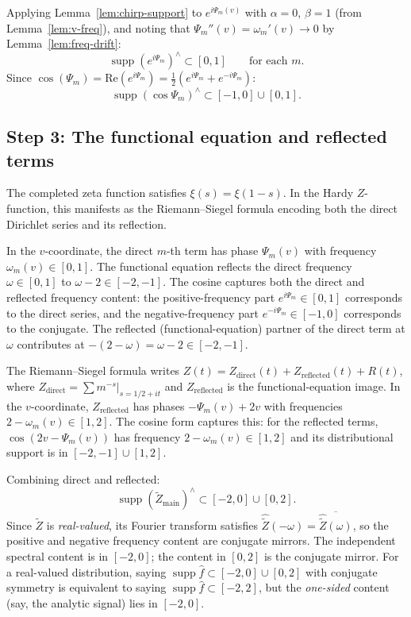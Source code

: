 \documentclass{article}
\newcommand{\tmem}[1]{{\em #1\/}}
\newcommand{\tmop}[1]{\ensuremath{\operatorname{#1}}}
\newcommand{\supp}{\tmop{supp}}
\begin{document}
Applying Lemma~\ref{lem:chirp-support} to $e^{i \Psi_m (v)}$ with $\alpha =
0$, $\beta = 1$ (from Lemma~\ref{lem:v-freq}), and noting that $\Psi_m'' (v) =
\omega_m' (v) \to 0$ by Lemma~\ref{lem:freq-drift}:
\begin{equation}
  \label{eq:direct-support} \supp (e^{i \Psi_m})^{\wedge} \subset [0, 1] 
  \qquad \text{for each } m.
\end{equation}
Since $\cos (\Psi_m) = \mathrm{Re} (e^{i \Psi_m}) = \tfrac{1}{2} (e^{i \Psi_m}
+ e^{- i \Psi_m})$:
\begin{equation}
  \label{eq:cos-support} \supp (\cos \Psi_m)^{\wedge} \subset [- 1, 0] \cup
  [0, 1] .
\end{equation}

\subsection*{Step 3: The functional equation and reflected terms}

The completed zeta function satisfies $\xi (s) = \xi (1 - s)$. In the Hardy
$Z$-function, this manifests as the Riemann--Siegel formula encoding both the
direct Dirichlet series and its reflection.

In the $v$-coordinate, the direct $m$-th term has phase $\Psi_m (v)$ with
frequency $\omega_m (v) \in [0, 1]$. The functional equation reflects the
direct frequency $\omega \in [0, 1]$ to $\omega - 2 \in [- 2, - 1]$. The
cosine captures both the direct and reflected frequency content: the
positive-frequency part $e^{i \Psi_m} \in [0, 1]$ corresponds to the direct
series, and the negative-frequency part $e^{- i \Psi_m} \in [- 1, 0]$
corresponds to the conjugate. The reflected (functional-equation) partner of
the direct term at $\omega$ contributes at $- (2 - \omega) = \omega - 2 \in [-
2, - 1]$.

The Riemann--Siegel formula writes $Z (t) = Z_{\mathrm{direct}} (t) +
Z_{\mathrm{reflected}} (t) + R (t)$, where $Z_{\mathrm{direct}} = \sum m^{- s}
|_{s = 1 / 2 + it}$ and $Z_{\mathrm{reflected}}$ is the functional-equation
image. In the $v$-coordinate, $Z_{\mathrm{reflected}}$ has phases $- \Psi_m
(v) + 2 v$ with frequencies $2 - \omega_m (v) \in [1, 2]$. The cosine form
captures this: for the reflected terms, $\cos (2 v - \Psi_m (v))$ has
frequency $2 - \omega_m (v) \in [1, 2]$ and its distributional support is in
$[- 2, - 1] \cup [1, 2]$.

Combining direct and reflected:
\begin{equation}
  \label{eq:combined-support} \supp (\tilde{Z}_{\mathrm{main}})^{\wedge}
  \subset [- 2, 0] \cup [0, 2] .
\end{equation}
Since $\tilde{Z}$ is {\tmem{real-valued}}, its Fourier transform satisfies
$\widehat{\tilde{Z}} (- \omega) = \overline{\widehat{\tilde{Z}} (\omega)}$, so
the positive and negative frequency content are conjugate mirrors. The
independent spectral content is in $[- 2, 0]$; the content in $[0, 2]$ is the
conjugate mirror. For a real-valued distribution, saying $\supp \hat{f}
\subset [- 2, 0] \cup [0, 2]$ with conjugate symmetry is equivalent to saying
$\supp \hat{f} \subset [- 2, 2]$, but the {\tmem{one-sided}} content (say, the
analytic signal) lies in $[- 2, 0]$.
\end{document}
